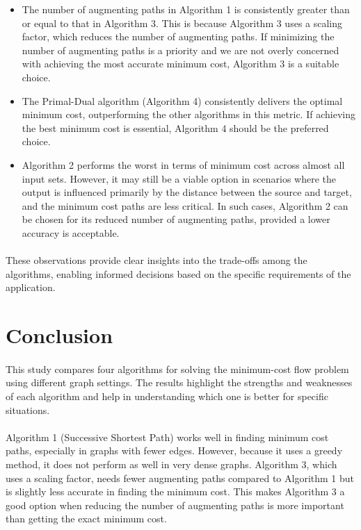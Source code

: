 \documentclass{article}
\begin{document}
\begin{itemize}
    \item The number of augmenting paths in Algorithm 1 is consistently greater than or equal to that in Algorithm 3. This is because Algorithm 3 uses a scaling factor, which reduces the number of augmenting paths. If minimizing the number of augmenting paths is a priority and we are not overly concerned with achieving the most accurate minimum cost, Algorithm 3 is a suitable choice.
    
    \item The Primal-Dual algorithm (Algorithm 4) consistently delivers the optimal minimum cost, outperforming the other algorithms in this metric. If achieving the best minimum cost is essential, Algorithm 4 should be the preferred choice.
    
    \item Algorithm 2 performs the worst in terms of minimum cost across almost all input sets. However, it may still be a viable option in scenarios where the output is influenced primarily by the distance between the source and target, and the minimum cost paths are less critical. In such cases, Algorithm 2 can be chosen for its reduced number of augmenting paths, provided a lower accuracy is acceptable.
\end{itemize}

\paragraph{}
These observations provide clear insights into the trade-offs among the algorithms, enabling informed decisions based on the specific requirements of the application.

\section{Conclusion}
\paragraph{}
This study compares four algorithms for solving the minimum-cost flow problem using different graph settings. The results highlight the strengths and weaknesses of each algorithm and help in understanding which one is better for specific situations.

\paragraph{}
Algorithm 1 (Successive Shortest Path) works well in finding minimum cost paths, especially in graphs with fewer edges. However, because it uses a greedy method, it does not perform as well in very dense graphs. Algorithm 3, which uses a scaling factor, needs fewer augmenting paths compared to Algorithm 1 but is slightly less accurate in finding the minimum cost. This makes Algorithm 3 a good option when reducing the number of augmenting paths is more important than getting the exact minimum cost.
\end{document}
